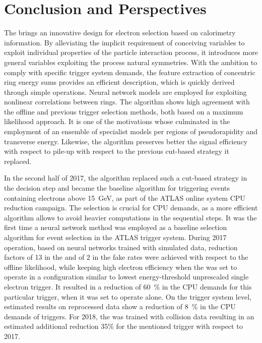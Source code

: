 \chapter{Conclusion and Perspectives}\label{sec:conclusion}


The \rnn{} brings an innovative design for electron selection based on
calorimetry information. By alleviating the implicit requirement of conceiving
variables to exploit individual properties of the particle interaction process, it introduces 
more general variables exploiting the process natural symmetries. With the
ambition to comply with specific trigger system demands, the feature extraction
of concentric ring energy sums provides an efficient description, which is quickly derived
through simple operations. Neural network models are employed for exploiting
nonlinear correlations between rings. The algorithm shows
high agreement with the offline and previous trigger selection methods, both based
on a maximum likelihood approach. It is one of the motivations whose culminated
in the employment of an ensemble of specialist models per regions of
pseudorapidity and transverse energy. Likewise, the \rnn{} algorithm preserves
better the signal efficiency with respect to pile-up with respect to the
previous cut-based strategy it replaced.



In the second half of 2017, the \rnn{} algorithm replaced such a cut-based strategy
in the \fastcalo{} decision step and became the baseline algorithm
for triggering events containing electrons above \SI{15}{\GeV}, as part of the ATLAS online system CPU reduction campaign. The \fastcalo{} selection is crucial for CPU demands, as a more
efficient algorithm allows to avoid heavier computations in the
sequential steps.  It was the first time a neural network method was employed as
a baseline selection algorithm for event selection in the ATLAS trigger system.
During 2017 operation, based on neural networks trained with simulated data,
reduction factors of 13 in the \fastcalo{} and of 2 in
the \hlt{} fake rates were achieved with respect to the offline likelihood, while
keeping high electron efficiency when the \rnn{} was set to operate in a
configuration similar to lowest energy-threshold unprescaled single electron
trigger. It resulted in a reduction of \SI{60}{\%} in the CPU demands for this particular trigger, when it was set to operate alone. On the trigger system level,
estimated results on reprocessed data show a reduction of \SI{8}{\%} in the CPU
demands of \egamma{} triggers. For 2018, the \rnn{} was trained with collision
data resulting in an estimated additional reduction 35\% for the
mentioned trigger with respect to 2017.

